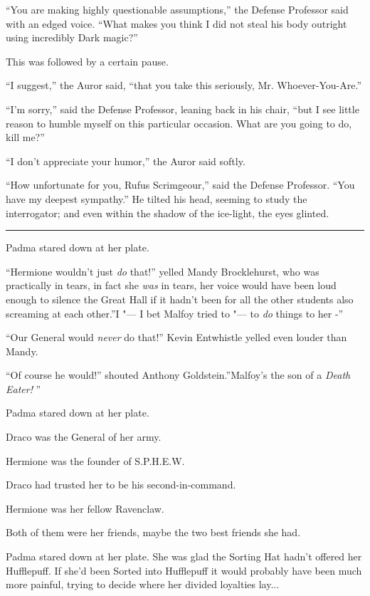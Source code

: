 ``You are making highly questionable assumptions,'' the Defense
Professor said with an edged voice. ``What makes you think I did not
steal his body outright using incredibly Dark magic?''

This was followed by a certain pause.

``I suggest,'' the Auror said, ``that you take this seriously, Mr.
Whoever-You-Are.''

``I'm sorry,'' said the Defense Professor, leaning back in his chair,
``but I see little reason to humble myself on this particular occasion.
What are you going to do, kill me?''

``I don't appreciate your humor,'' the Auror said softly.

``How unfortunate for you, Rufus Scrimgeour,'' said the Defense
Professor. ``You have my deepest sympathy.'' He tilted his head, seeming
to study the interrogator; and even within the shadow of the ice-light,
the eyes glinted.

\begin{center}\rule{3in}{0.4pt}\end{center}

Padma stared down at her plate.

``Hermione wouldn't just \emph{do} that!'' yelled Mandy Brocklehurst, who
was practically in tears, in fact she \emph{was} in tears, her voice
would have been loud enough to silence the Great Hall if it hadn't been
for all the other students also screaming at each other.''I "--- I bet
Malfoy tried to "--- to \emph{do} things to her -''

``Our General would \emph{never} do that!'' Kevin Entwhistle yelled even
louder than Mandy.

``Of course he would!'' shouted Anthony Goldstein.''Malfoy's the son of
a \emph{Death Eater!} ''

Padma stared down at her plate.

Draco was the General of her army.

Hermione was the founder of S.P.H.E.W.

Draco had trusted her to be his second-in-command.

Hermione was her fellow Ravenclaw.

Both of them were her friends, maybe the two best friends she had.

Padma stared down at her plate. She was glad the Sorting Hat hadn't
offered her Hufflepuff. If she'd been Sorted into Hufflepuff it would
probably have been much more painful, trying to decide where her divided
loyalties lay...


